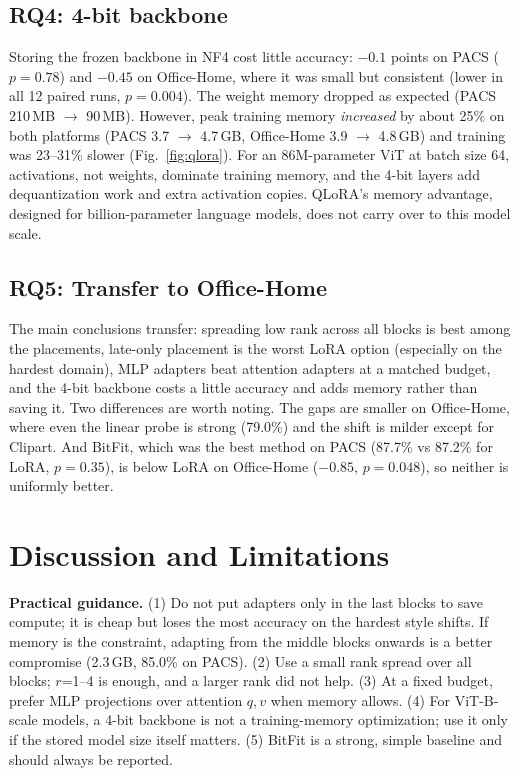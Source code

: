 \documentclass[10pt,twocolumn]{article}
\begin{document}
\subsection{RQ4: 4-bit backbone}
Storing the frozen backbone in NF4 cost little accuracy: $-0.1$ points on PACS ($p=0.78$) and $-0.45$ on Office-Home,
where it was small but consistent (lower in all 12 paired runs, $p=0.004$). The weight memory dropped as expected
(PACS 210\,MB $\rightarrow$ 90\,MB). However, peak training memory \emph{increased} by about 25\% on both platforms
(PACS 3.7 $\rightarrow$ 4.7\,GB, Office-Home 3.9 $\rightarrow$ 4.8\,GB) and training was 23--31\% slower
(Fig.~\ref{fig:qlora}). For an 86M-parameter ViT at batch size 64, activations, not weights, dominate training
memory, and the 4-bit layers add dequantization work and extra activation copies. QLoRA's memory advantage,
designed for billion-parameter language models, does not carry over to this model scale.

\subsection{RQ5: Transfer to Office-Home}
The main conclusions transfer: spreading low rank across all blocks is best among the placements, late-only
placement is the worst LoRA option (especially on the hardest domain), MLP adapters beat attention adapters at a
matched budget, and the 4-bit backbone costs a little accuracy and adds memory rather than saving it. Two
differences are worth noting. The gaps are smaller on Office-Home, where even the linear probe is strong (79.0\%)
and the shift is milder except for Clipart. And BitFit, which was the best method on PACS (87.7\% vs 87.2\% for
LoRA, $p=0.35$), is below LoRA on Office-Home ($-0.85$, $p=0.048$), so neither is uniformly better.

\section{Discussion and Limitations}
\textbf{Practical guidance.} (1) Do not put adapters only in the last blocks to save compute; it is cheap but
loses the most accuracy on the hardest style shifts. If memory is the constraint, adapting from the middle blocks
onwards is a better compromise (2.3\,GB, 85.0\% on PACS). (2) Use a small rank spread over all blocks; $r$=1--4 is
enough, and a larger rank did not help. (3) At a fixed budget, prefer MLP projections over attention $q,v$ when
memory allows. (4) For ViT-B-scale models, a 4-bit backbone is not a training-memory optimization; use it only if
the stored model size itself matters. (5) BitFit is a strong, simple baseline and should always be reported.
\end{document}
